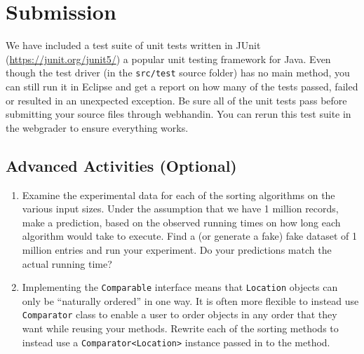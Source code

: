 \documentclass[12pt]{scrartcl}
\begin{document}
\section*{Submission}

We have included a test suite of unit tests written in JUnit 
(\url{https://junit.org/junit5/}) a popular unit testing framework for
Java.  Even though the test driver (in the \texttt{src/test}
source folder) has no main method, you can still run it in Eclipse and
get a report on how many of the tests passed, failed or resulted in 
an unexpected exception.  Be sure all of the unit tests pass before
submitting your source files through webhandin.  You can rerun this
test suite in the webgrader to ensure everything works.  

\subsection*{Advanced Activities (Optional)}

\begin{enumerate}
  \item Examine the experimental data for each of the sorting algorithms 
    on the various input sizes.  Under the assumption that we have 1 
    million records, make a prediction, based on the observed running 
    times on how long each algorithm would take to execute.  Find a (or 
    generate a fake) fake dataset of 1 million entries and run your 
    experiment.  Do your predictions match the actual running time?
  \item Implementing the \texttt{Comparable} interface means 
    that \texttt{Location} objects can only be ``naturally 
    ordered'' in one way.  It is often more flexible to instead use 
    \texttt{Comparator} class to enable a user to order objects 
    in any order that they want while reusing your methods.  Rewrite 
    each of the sorting methods to instead use a 
    \texttt{Comparator<Location>} instance passed in to the 
    method. 
\end{enumerate}
\end{document}
